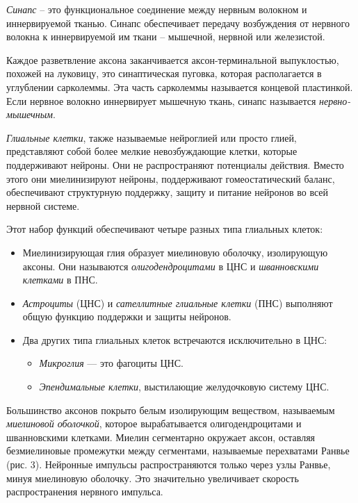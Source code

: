 \documentclass{article}
\begin{document}
        \textit{Синапс} – это функциональное соединение между нервным волокном и
        иннервируемой тканью. Синапс обеспечивает передачу возбуждения от нервного
        волокна к иннервируемой им ткани – мышечной, нервной или железистой.
        \vspace*{4mm}

        Каждое разветвление аксона заканчивается аксон-терминальной
        выпуклостью, похожей на луковицу, это синаптическая пуговка, которая
        располагается в углублении сарколеммы. Эта часть сарколеммы называется
        концевой пластинкой. Если нервное волокно иннервирует мышечную ткань,
        синапс называется \textit{нервно-мышечным}.
        \vspace*{4mm}

        \textit{Глиальные клетки}, также называемые нейроглией или просто глией,
        представляют собой более мелкие невозбуждающие клетки, которые
        поддерживают нейроны. Они не распространяют потенциалы действия. Вместо
        этого они миелинизируют нейроны, поддерживают гомеостатический баланс,
        обеспечивают структурную поддержку, защиту и питание нейронов во всей
        нервной системе.
        \newpage

        Этот набор функций обеспечивают четыре разных типа глиальных клеток:

        \begin{itemize}
            \item Миелинизирующая глия образует миелиновую оболочку, изолирующую
            аксоны. Они называются \textit{олигодендроцитами} в ЦНС и \textit{шванновскими
            клетками} в ПНС.

            \item \textit{Астроциты} (ЦНС) и \textit{сателлитные глиальные клетки} (ПНС) выполняют
            общую функцию поддержки и защиты нейронов.

            \item Два других типа глиальных клеток встречаются исключительно в ЦНС:
                \begin{itemize}
                    \item \textit{Микроглия} — это фагоциты ЦНС.
                    \item \textit{Эпендимальные клетки}, выстилающие желудочковую систему ЦНС.
                \end{itemize} 
        \end{itemize}

        Большинство аксонов покрыто белым изолирующим веществом,
        называемым \textit{миелиновой оболочкой}, которое вырабатывается
        олигодендроцитами и шванновскими клетками. Миелин сегментарно
        окружает аксон, оставляя безмиелиновые промежутки между сегментами,
        называемые перехватами Ранвье (рис. 3). Нейронные импульсы
        распространяются только через узлы Ранвье, минуя миелиновую оболочку. Это
        значительно увеличивает скорость распространения нервного импульса.
\end{document}
